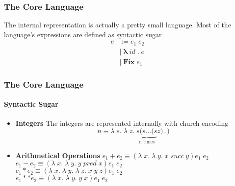 \documentclass[xcolor=table]{beamer}
\newcommand{\bs}[1]{\boldsymbol{#1}}
\begin{document}
%

\begin{frame}
\frametitle{The Core Language}
\begin{block}{The internal representation is actually a pretty small language. Most of the language's expressions are defined as syntactic sugar}
\begin{align*}
e & := e_1 \; e_2 	 \\
   & | \; \bs{\lambda} \; id \; \bs{ .} \; e \\
   & | \; \bs{Fix} \; e_1                                                                 
\end{align*}
\end{block}
\end{frame}

%

\begin{frame}
\frametitle{The Core Language}
\framesubtitle{Syntactic Sugar}
\begin{block}{}
\begin{itemize}
\item \textbf{Integers} The integers are represented internally with church encoding\\
$$n \equiv \lambda \;s.\; \lambda \; z. \; \underbrace{s(s ... (s }_\text{n times} z)..)$$
\item \textbf{Arithmetical Operations} $e_1 + e_2 \equiv (\lambda \; x. \; \lambda \; y.\; x \; succ \; y) e_1 \; e_2$\\
$e_1 - e_2 \equiv (\lambda \; x. \; \lambda \; y.\; y \; pred \; x) e_1 \; e_2$ \\
$e_1 * e_2 \equiv (\lambda \; x. \; \lambda \; y.\; \lambda \; z. \;  x \; y \; z) e_1 \; e_2$ \\
$e_1 ** e_2 \equiv (\lambda \; x. \; \lambda \; y.\;  y \; x ) e_1 \; e_2$ \\
\end{itemize}
\end{block}
\end{frame}
\end{document}
